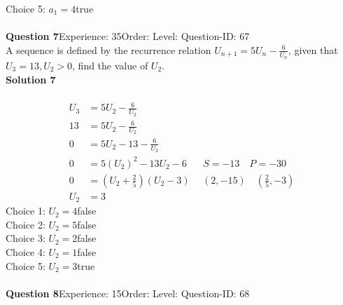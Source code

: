 \documentclass{article}
\begin{document}
Choice 5: \hspace{20pt}$a_1=4$\hspace{20pt}true\\
\\[4pt]
\noindent\textbf{Question 7}\hspace{20pt}Experience: 35\hspace{20pt}Order: \hspace{20pt}Level: \hspace{20pt}Question-ID: 67\\[2pt]
A sequence is defined by the recurrence relation $U_{n+1}=5U_n-\displaystyle\frac{6}{U_n}$, given that  $U_3 =13, U_2 > 0$, find the value of $U_2$.\\[4pt]
\noindent\textbf{Solution 7}\\[2pt]
\\[-35pt]\begin{align*}
U_3&=5U_2-\displaystyle\frac{6}{U_2}\\[2pt]
13&=5U_2-\displaystyle\frac{6}{U_2}\\[2pt]
0&=5U_2-13 -\displaystyle\frac{6}{U_2}\\[2pt]
0&=5(U_2)^2-13U_2 -6\hspace{20pt}S=-13\quad P=-30\\[2pt]
0&=\left(U_2+\displaystyle\frac{2}{5}\right)(U_2-3)\hspace{15pt}(2,-15)\quad \left(\displaystyle\frac{2}{5},-3\right)\\[2pt]
U_2&=3
\end{align*}
Choice 1: \hspace{20pt}$U_2=4$\hspace{20pt}false\\
Choice 2: \hspace{20pt}$U_2=5$\hspace{20pt}false\\
Choice 3: \hspace{20pt}$U_2=2$\hspace{20pt}false\\
Choice 4: \hspace{20pt}$U_2=1$\hspace{20pt}false\\
Choice 5: \hspace{20pt}$U_2=3$\hspace{20pt}true\\
\\[4pt]
\noindent\textbf{Question 8}\hspace{20pt}Experience: 15\hspace{20pt}Order: \hspace{20pt}Level: \hspace{20pt}Question-ID: 68\\[2pt]
\end{document}
